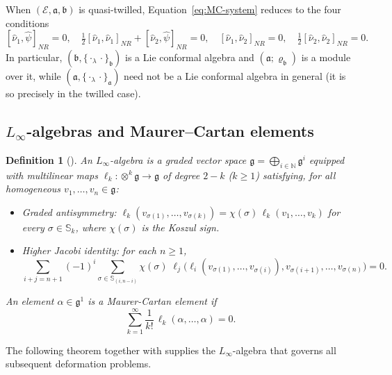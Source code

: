 \documentclass[a4paper,11pt]{article}
\def\Ep{\mathcal{E}}
\def\Vs{\mathfrak{a}}
\def\Ws{\mathfrak{b}}
\def\rep{\varrho}
\def\smu{\widehat{\nu}_1}
\def\smv{\widehat{\nu}_2}
\def\shf{\widehat{\psi}}
\def\la{\lambda}
\def\half{\tfrac{1}{2}}
\def\perm{\mathbb{S}}
\def\Nat{\mathbb{N}}
\numberwithin{equation}{section}
\newtheorem{definition}[theorem]{Definition}
\begin{document}
When $(\Ep,\Vs,\Ws)$ is quasi-twilled, Equation~\eqref{eq:MC-system}
reduces to the four conditions
\begin{equation}\label{eq:quasi-MC}
  [\smu,\shf]_{NR} = 0,\quad
  \half[\smu,\smu]_{NR} + [\smv,\shf]_{NR} = 0,\quad
  [\smu,\smv]_{NR} = 0,\quad
  \half[\smv,\smv]_{NR} = 0.
\end{equation}
In particular, $(\Ws,\{\cdot_\la\cdot\}_\Ws)$ is a Lie conformal  algebra
and $(\Vs;\rep_\Ws)$ is a module over it, while $(\Vs,\{\cdot_\la\cdot\}_\Vs)$
need not be a Lie conformal  algebra in general (it is so precisely in
the twilled case).

\subsection{$L_\infty$-algebras and Maurer--Cartan elements}
\label{subsec:Linf}

\begin{definition}[{\cite{LS,LM}}]\label{def:Linf}
An \textit{$L_\infty$-algebra} is a graded vector space
$\mathfrak{g}=\bigoplus_{i\in\Nat}\mathfrak{g}^i$ equipped with
multilinear maps $\ell_k:\otimes^k\mathfrak{g}\to\mathfrak{g}$ of
degree $2-k$ ($k\geq 1$) satisfying, for all homogeneous
$v_1,\ldots,v_n\in\mathfrak{g}$:
\begin{itemize}
  \item[\rm(i)] \emph{Graded antisymmetry:}
    $\ell_k(v_{\sigma(1)},\ldots,v_{\sigma(k)})
    = \chi(\sigma)\,\ell_k(v_1,\ldots,v_k)$
    for every $\sigma\in\perm_k$, where $\chi(\sigma)$ is the Koszul sign.
  \item[\rm(ii)] \emph{Higher Jacobi identity:} for each $n\geq1$,
    \[
      \sum_{i+j=n+1}(-1)^i
      \sum_{\sigma\in\perm_{(i,n-i)}}
      \!\!\chi(\sigma)\;\ell_j\!\bigl(\ell_i(v_{\sigma(1)},\ldots,v_{\sigma(i)}),
      v_{\sigma(i+1)},\ldots,v_{\sigma(n)}\bigr) = 0.
    \]
\end{itemize}
An element $\alpha\in\mathfrak{g}^1$ is a \textit{Maurer-Cartan element} if
\[
  \sum_{k=1}^\infty \frac{1}{k!}\,\ell_k(\alpha,\ldots,\alpha) = 0.
\]
\end{definition}

The following theorem together with \cite[Corollary~3.5]{Uch1}
supplies the $L_\infty$-algebra that governs all subsequent deformation
problems.
\end{document}
